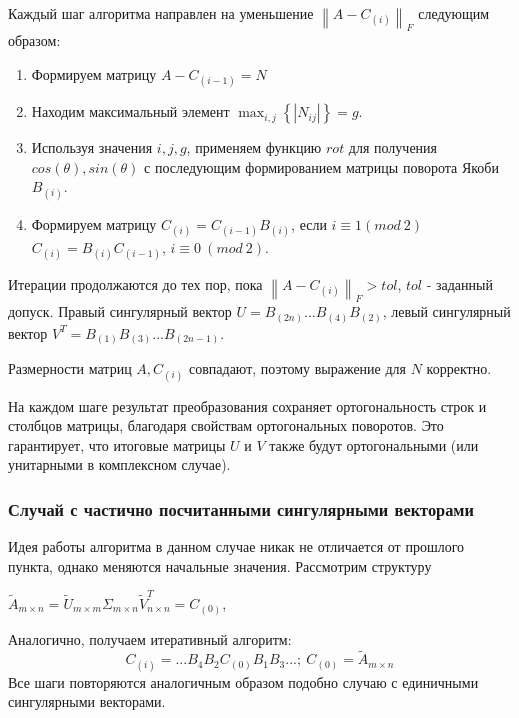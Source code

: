 Каждый шаг алгоритма направлен на уменьшение $\left\|  A-C_{(i)}\right\|_F$ следующим образом:
\begin{enumerate}
    \item Формируем матрицу $A-C_{(i-1)} = N$
    \item Находим максимальный элемент $\displaystyle\max_{i,j}\left\{ \left| N_{ij} \right| \right\} = g$. 
    \item Используя значения $i,j,g$, применяем функцию $rot$ для получения $cos(\theta),sin(\theta)$ с последующим формированием матрицы поворота Якоби $B_{(i)}$. 
    \item Формируем матрицу $C_{(i)} = C_{(i - 1)}B_{(i)}$, если $i \equiv 1(mod\ 2)$\newline
    $C_{(i)} = B_{(i)}C_{(i - 1)}$, $i \equiv 0 \ (mod\ 2)$.
\end{enumerate}
Итерации продолжаются до тех пор, пока $\left\|  A-C_{(i)}\right\|_F >tol$, $tol$ - заданный допуск. Правый сингулярный вектор $U = B_{(2n)}...B_{(4)}B_{(2)}$, левый сингулярный вектор $V^T = B_{(1)}B_{(3)}...B_{(2n-1)}$.

\begin{note}
    Размерности матриц $A, C_{(i)}$ совпадают, поэтому выражение для $N$ корректно.
\end{note}
\begin{note}
    На каждом шаге результат преобразования сохраняет ортогональность строк и столбцов матрицы, благодаря свойствам ортогональных поворотов. Это гарантирует, что итоговые матрицы $U$ и $V$ также будут ортогональными (или унитарными в комплексном случае).
\end{note}

\subsubsection{Случай с частично посчитанными сингулярными векторами} %
Идея работы алгоритма в данном случае никак не отличается от прошлого пункта, однако меняются начальные значения. Рассмотрим структуру 
\begin{center}
    $\tilde{A}_{m \times n} = \tilde{U}_{m\times m}\Sigma_{m\times n}\tilde{V}^T_{n \times n} = C_{(0)}$,
\end{center}
Аналогично, получаем итеративный алгоритм:
\begin{equation}
    C_{(i)}=...B_4B_2C_{(0)}B_1B_3...;\ C_{(0)} = \tilde{A}_{m \times n}
\end{equation}
Все шаги повторяются аналогичным образом подобно случаю с единичными сингулярными векторами.

